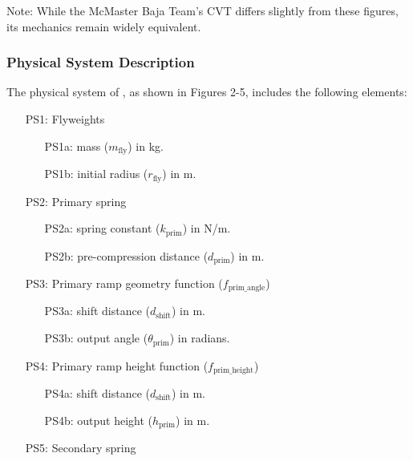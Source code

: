 \documentclass[12pt]{article}
\begin{document}
Note: While the McMaster Baja Team's CVT differs slightly from these figures, its mechanics remain widely equivalent.


\subsubsection{Physical System Description} \label{sec_phySystDescrip}

The physical system of \progname{}, as shown in Figures 2-5,
includes the following elements:

\begin{itemize}

\item[PS1:] Flyweights
\begin{itemize}
  \item [PS1a:] mass ($m_{\text{fly}}$) in kg.
  \item [PS1b:] initial radius ($r_{\text{fly}}$) in m.
\end{itemize}

\item[PS2:] Primary spring

\begin{itemize}
  \item [PS2a:] spring constant ($k_{\text{prim}}$) in N/m.
  \item [PS2b:] pre-compression distance ($d_{\text{prim}}$) in m.
\end{itemize}

\item[PS3:] Primary ramp geometry function ($f_{\text{prim\_angle}}$)

\begin{itemize}
  \item [PS3a:] shift distance ($d_{\text{shift}}$) in m.
  \item [PS3b:] output angle ($\theta_{\text{prim}}$) in radians.
\end{itemize}

\item[PS4:] Primary ramp height function ($f_{\text{prim\_height}}$)

\begin{itemize}
  \item [PS4a:] shift distance ($d_{\text{shift}}$) in m.
  \item [PS4b:] output height ($h_{\text{prim}}$) in m.
\end{itemize}

\item[PS5:] Secondary spring


\end{itemize}
\end{document}

